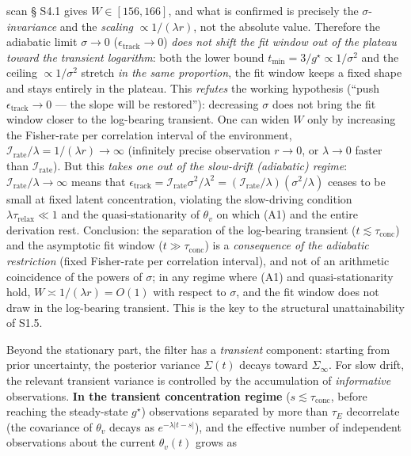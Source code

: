 \documentclass[12pt]{iopart}
\begin{document}
scan § S4.1 gives \(W \in [156, 166]\), and what is confirmed is precisely the \(\sigma\)-\emph{invariance} and the \emph{scaling} \(\propto 1/(\lambda r)\), not the absolute value. Therefore the adiabatic limit \(\sigma \to 0\) (\(\epsilon_{\text{track}} \to 0\)) \emph{does not shift the fit window out of the plateau toward the transient logarithm}: both the lower bound \(t_{\min} = 3/g^\star \propto 1/\sigma^2\) and the ceiling \(\propto 1/\sigma^2\) stretch \emph{in the same proportion}, the fit window keeps a fixed shape and stays entirely in the plateau. This \emph{refutes} the working hypothesis (``push \(\epsilon_{\text{track}} \to 0\) --- the slope will be restored''): decreasing \(\sigma\) does not bring the fit window closer to the log-bearing transient. One can widen \(W\) only by increasing the Fisher-rate per correlation interval of the environment, \(\mathcal I_{\text{rate}}/\lambda = 1/(\lambda r) \to \infty\) (infinitely precise observation \(r \to 0\), or \(\lambda \to 0\) faster than \(\mathcal I_{\text{rate}}\)). But this \emph{takes one out of the slow-drift (adiabatic) regime}: \(\mathcal I_{\text{rate}}/\lambda \to \infty\) means that \(\epsilon_{\text{track}} = \mathcal I_{\text{rate}}\sigma^2/\lambda^2 = (\mathcal I_{\text{rate}}/\lambda)(\sigma^2/\lambda)\) ceases to be small at fixed latent concentration, violating the slow-driving condition \(\lambda\tau_{\text{relax}}\ll1\) and the quasi-stationarity of \(\theta_v\) on which (A1) and the entire derivation rest. Conclusion: the separation of the log-bearing transient (\(t\lesssim\tau_{\text{conc}}\)) and the asymptotic fit window (\(t\gg\tau_{\text{conc}}\)) is a \emph{consequence of the adiabatic restriction} (fixed Fisher-rate per correlation interval), and not of an arithmetic coincidence of the powers of \(\sigma\); in any regime where (A1) and quasi-stationarity hold, \(W \asymp 1/(\lambda r) = O(1)\) with respect to \(\sigma\), and the fit window does not draw in the log-bearing transient. This is the key to the structural unattainability of S1.5.



Beyond the stationary part, the filter has a \emph{transient} component: starting from prior uncertainty, the posterior variance \(\Sigma(t)\) decays toward \(\Sigma_\infty\). For slow drift, the relevant transient variance is controlled by the accumulation of \emph{informative} observations. \textbf{In the transient concentration regime} (\(s \lesssim \tau_{\text{conc}}\), before reaching the steady-state \(g^\star\)) observations separated by more than \(\tau_E\) decorrelate (the covariance of \(\theta_v\) decays as \(e^{-\lambda|t-s|}\)), and the effective number of independent observations about the current \(\theta_v(t)\) grows as
\end{document}

